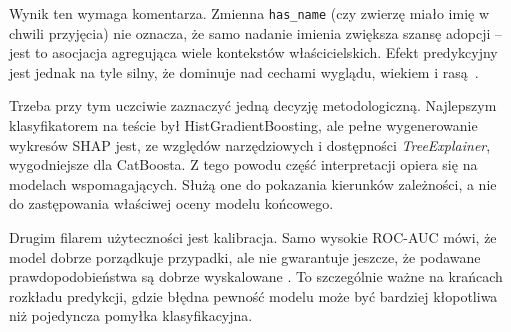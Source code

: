

Wynik ten wymaga komentarza. Zmienna \texttt{has\_name} (czy zwierzę miało imię w chwili przyjęcia) nie oznacza, że samo nadanie imienia zwiększa szansę adopcji -- jest to asocjacja agregująca wiele kontekstów właścicielskich. Efekt predykcyjny jest jednak na tyle silny, że dominuje nad cechami wyglądu, wiekiem i rasą~\cite{Lundberg2020}.


Trzeba przy tym uczciwie zaznaczyć jedną decyzję metodologiczną. Najlepszym klasyfikatorem na teście był HistGradientBoosting, ale pełne wygenerowanie wykresów SHAP jest, ze względów narzędziowych i dostępności \emph{TreeExplainer}, wygodniejsze dla CatBoosta. Z tego powodu część interpretacji opiera się na modelach wspomagających. Służą one do pokazania kierunków zależności, a nie do zastępowania właściwej oceny modelu końcowego.

Drugim filarem użyteczności jest kalibracja. Samo wysokie ROC-AUC mówi, że model dobrze porządkuje przypadki, ale nie gwarantuje jeszcze, że podawane prawdopodobieństwa są dobrze wyskalowane \cite{Fawcett2006,Brier1950}. To szczególnie ważne na krańcach rozkładu predykcji, gdzie błędna pewność modelu może być bardziej kłopotliwa niż pojedyncza pomyłka klasyfikacyjna.


